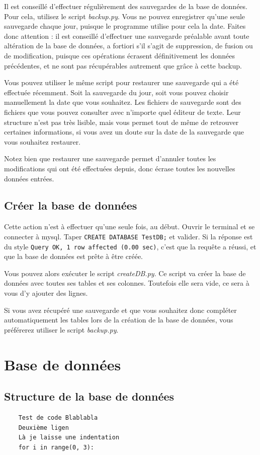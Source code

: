 \documentclass[12pt,a4paper]{article}
\begin{document}
    Il est conseillé d'effectuer régulièrement des sauvegardes de la base de données.
    Pour cela, utilisez le script \emph{backup.py}. Vous ne pouvez enregistrer qu'une seule sauvegarde
    chaque jour, puisque le programme utilise pour cela la date. Faites donc attention : il est conseillé d'effectuer
    une sauvegarde préalable avant toute altération de la base de données, a fortiori s'il s'agit de suppression,
    de fusion ou de modification, puisque ces opérations écrasent définitivement les données précédentes, et ne sont
    pas récupérables autrement que grâce à cette backup.

    Vous pouvez utiliser le même script pour restaurer une sauvegarde qui a été effectuée récemment. Soit la sauvegarde
    du jour, soit vous pouvez choisir manuellement la date que vous souhaitez.
    Les fichiers de sauvegarde sont des fichiers que vous pouvez consulter avec n'importe quel éditeur de texte.
    Leur structure n'est pas très lisible, mais vous permet tout de même de retrouver certaines informations, si vous
    avez un doute sur la date de la sauvegarde que vous souhaitez restaurer.

    Notez bien que restaurer une sauvegarde permet d'annuler toutes les modifications qui ont été effectuées depuis,
    donc écrase toutes les nouvelles données entrées.


\bigskip
\subsection{Créer la base de données}

    Cette action n'est à effectuer qu'une seule fois, au début.
    Ouvrir le terminal %
    et se connecter à mysql.
    Taper \verb+CREATE DATABASE TestDB;+ et valider. Si la réponse est du
    style \verb+Query OK, 1 row affected (0.00 sec)+, c'est que la requête
    a réussi, et que la base de données est prête à être créée.
    
    Vous pouvez alors exécuter le script \emph{createDB.py}. Ce script va créer
    la base de données avec toutes ses tables et ses colonnes. Toutefois elle
    sera vide, ce sera à vous d'y ajouter des lignes.

    Si vous avez récupéré une sauvegarde et que vous souhaitez donc compléter
    automatiquement les tables lors de la création de la base de données, vous
    préférerez utiliser le script \emph{backup.py}.


\clearpage
\section{Base de données}

\bigskip
\subsection{Structure de la base de données}

\begin{verbatim}
    Test de code Blablabla
    Deuxième ligen
    Là je laisse une indentation
    for i in range(0, 3):
\end{verbatim}
\end{document}
